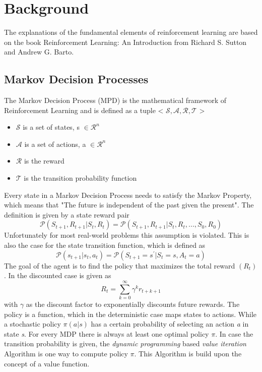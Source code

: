 \chapter{Background}\label{chap:background}

The explanations of the fundamental elements of reinforcement learning are based on the book Reinforcement Learning:
An Introduction\cite{Sutton1998} from Richard S. Sutton and Andrew G. Barto.

\section{Markov Decision Processes}
The Markov Decision Process (MPD)  is the mathematical framework of Reinforcement Learning and
is defined as a tuple < $\mathcal{S, A, R, T}$ >
\begin{itemize}
\item $\mathcal{S}$ is a set of states, s $\in \mathcal{R}^{n}$
\item $\mathcal{A}$ is a set of actions, a $ \in \mathcal{R}^{n}$
\item $\mathcal{R}$ is the reward
\item $\mathcal{T}$ is the transition probability function
\end{itemize}
Every state in a Markov Decision Process needs to satisfy the Markov Property,
which means that "The future is independent of the past given the present".
The definition is given by a state reward pair 
\begin{equation}
\mathcal{P}(S_{t+1}, R_{t+1} | S_{t}, R_{t}) =  \mathcal{P}(S_{t+1}, R_{t+1} | S_{t}, R_{t}, ..., S_{0}, R_{0})
\end{equation}
Unfortunately for most real-world problems this assumption is violated. This is also the case for the
state transition function, which is defined as
\begin{equation}
  \mathcal{P}(s_{t+1}| s_{t}, a_{t}) =  \mathcal{P}(S_{t+1} = s^{'}| S_{t} = s ,  A_{t} = a)
\end{equation}
 The goal of the agent is to find the policy that maximizes the total reward $(R_{t})$.
In the discounted case is given as 
\begin{equation}
  R_t = \sum^{\infty}_{k = 0} \gamma^k r_{t+k+1}
\end{equation}
with $\gamma$ as the discount factor to exponentially discounts future rewards. 
The policy is a function, which in the deterministic case maps states to actions.
While a stochastic policy $\pi(a|s)$ has a certain probability of selecting an action \textit{a} in state \textit{s}.
For every MDP there is always at least one optimal policy $\pi$. 
In case the transition probability is given, the \textit{dynamic programming} based \textit{value iteration} Algorithm is one way to compute policy $\pi$.
This Algorithm is build upon the concept of a value function.
